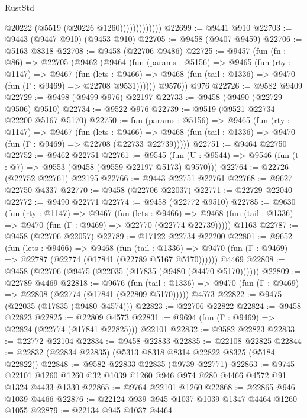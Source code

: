 \begin{lexlean}{RustStd}
\begin{coremodule}
                          @20222
                          (@5519 (@20226 @1260)))))))))))))
@22699 := @9441 @910
@22703 := @9443 (@9447 @910) (@9453 @910)
@22705 := @9458 (@9407 @9459)
@22706 := @5163 @8318
@22708 := @9458 (@22706 @9486)
@22725 := @9457
    (fun (fn : @86) =>
    @22705
      (@9462
        (@9464
          (fun (params : @5156) =>
          @9465
            (fun (rty : @1147) =>
            @9467
              (fun (lets : @9466) =>
              @9468 (fun (tail : @1336) => @9470 (fun (Γ : @9469) => @22708 @9531))))))
        @9576))
    @976
@22726 := @9582 @9409
@22729 := @9498 (@9499 @976) @22197
@22733 := @9458 (@9490 (@22729 @9506) @9510)
@22734 := @9522 @976
@22739 := @9519 (@9521 @22734 @22200 @5167 @5170)
@22750 := fun (params : @5156) =>
  @9465
    (fun (rty : @1147) =>
    @9467
      (fun (lets : @9466) =>
      @9468 (fun (tail : @1336) => @9470 (fun (Γ : @9469) => @22708 (@22733 @22739)))))
@22751 := @9464 @22750
@22752 := @9462 @22751
@22761 := @9545
    (fun (U : @9544) => @9546 (fun (t : @7) => @9553 (@9458 (@9559 @22197 @5173) @9570)))
@22764 := @22726 (@22752 @22761) @22195
@22766 := @9443 @22751 @22761
@22768 := @9627 @22750 @4337
@22770 := @9458 (@22706 @22037)
@22771 := @22729 @22040
@22772 := @9490 @22771
@22774 := @9458 (@22772 @9510)
@22785 := @9630
    (fun (rty : @1147) =>
    @9467
      (fun (lets : @9466) =>
      @9468 (fun (tail : @1336) => @9470 (fun (Γ : @9469) => @22770 (@22774 @22739)))))
    @1163
@22787 := @9458 (@22706 @22057)
@22789 := @17122 @22734 @22200
@22801 := @9652
    (fun (lets : @9466) =>
    @9468
      (fun (tail : @1336) =>
      @9470 (fun (Γ : @9469) => @22787 (@22774 (@17841 (@22789 @5167 @5170))))))
    @4469
@22808 := @9458 (@22706 (@9475 (@22035 (@17835 (@9480 (@4470 @5170))))))
@22809 := @22789 @4469
@22818 := @9676
    (fun (tail : @1336) => @9470 (fun (Γ : @9469) => @22808 (@22774 (@17841 (@22809 @5170)))))
    @4573
@22822 := @9475 (@22035 (@17835 (@9480 @4574)))
@22823 := @22706 @22822
@22824 := @9458 @22823
@22825 := @22809 @4573
@22831 := @9694 (fun (Γ : @9469) => @22824 (@22774 (@17841 @22825))) @22101
@22832 := @9582 @22823
@22833 := @22772 @22104
@22834 := @9458 @22833
@22835 := @22108 @22825
@22844 := @22832 (@22834 @22835) (@5313 @8318 @8314 @22822 @8325 (@5184 @22822))
@22848 := @9582 @22833 @22835 (@9739 @22771)
@22863 := @9745 @22101 @1260 @1260 @32 @1039 @1260 @946 @974 @280 @4466 @4572 @91 @1324 @4433 @1330
@22865 := @9764 @22101 @1260
@22868 := @22865 @946 @1039 @4466
@22876 := @22124 @939 @945 @1037 @1039 @1347 @4464 @1260 @1055
@22879 := @22134 @945 @1037 @4464

\end{coremodule}
\end{lexlean}
